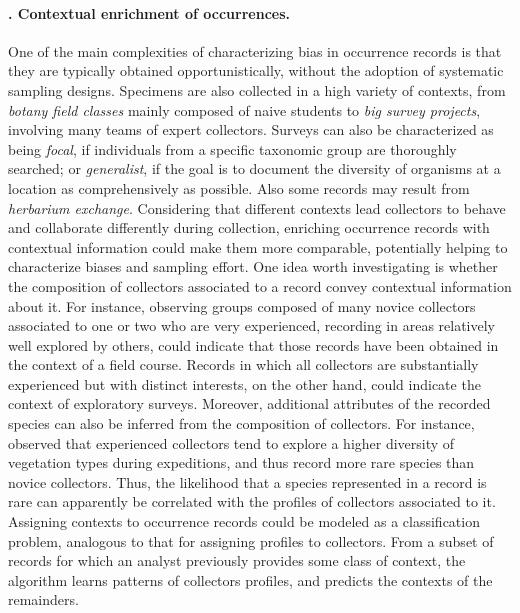 \paragraph*{\theApplicationCase. Contextual enrichment of occurrences.}
One of the main complexities of characterizing bias in occurrence records is that they are typically obtained opportunistically, without the adoption of systematic sampling designs.
Specimens are also collected in a high variety of contexts, from \textit{botany field classes} mainly composed of naive students to \textit{big survey projects}, involving many teams of expert collectors.
Surveys can also be characterized as being \textit{focal}, if individuals from a specific taxonomic group are thoroughly searched; or \textit{generalist}, if the goal is to document the diversity of organisms at a location as comprehensively as possible.
Also some records may result from \textit{herbarium exchange}.
Considering that different contexts lead collectors to behave and collaborate differently during collection, enriching occurrence records with contextual information could make them more comparable, potentially helping to characterize biases and sampling effort. 
%
One idea worth investigating is whether the composition of collectors associated to a record convey contextual information about it.
For instance, observing groups composed of many novice collectors associated to one or two who are very experienced, recording in areas relatively well explored by others, could indicate that those records have been obtained in the context of a field course.
Records in which all collectors are substantially experienced but with distinct interests, on the other hand, could indicate the context of exploratory surveys.
%
Moreover, additional attributes of the recorded species can also be inferred from the composition of collectors.
For instance,  observed that experienced collectors tend to explore a higher diversity of vegetation types during expeditions, and thus record more rare species than novice collectors.
Thus, the likelihood that a species represented in a record is rare can apparently be correlated with the profiles of collectors associated to it.
%
Assigning contexts to occurrence records could be modeled as a classification problem, analogous to that for assigning profiles to collectors.
From a subset of records for which an analyst previously provides some class of context, the algorithm learns patterns of collectors profiles, and predicts the contexts of the remainders.




